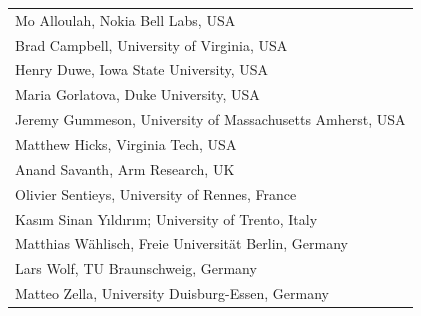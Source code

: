 \documentclass[a4paper,10pt]{scrartcl}
\begin{document}
\begin{minipage}{.49\textwidth}
\begin{tcolorbox}[boxsep=0pt, top=2mm, left=2mm, right=2mm, bottom=0mm, arc=5pt, auto outer arc, colback=cfp_lightcolor, colframe=white]
  \vskip1mm
  \begin{tabular}{l}
Mo Alloulah, Nokia Bell Labs, USA \\
Brad Campbell, University of Virginia, USA \\
Henry Duwe, Iowa State University, USA \\
Maria Gorlatova, Duke University, USA \\
Jeremy Gummeson, University of Massachusetts Amherst, USA \\
Matthew Hicks, Virginia Tech, USA \\
Anand Savanth, Arm Research, UK \\
Olivier Sentieys, University of Rennes, France \\
Kasım Sinan Yıldırım; University of Trento, Italy \\
Matthias Wählisch, Freie Universität Berlin, Germany \\
Lars Wolf, TU Braunschweig, Germany \\
Matteo Zella, University Duisburg-Essen, Germany \\
  \end{tabular}
  \vspace{1mm}
\end{tcolorbox}
\end{minipage}
\hfill
\end{document}

